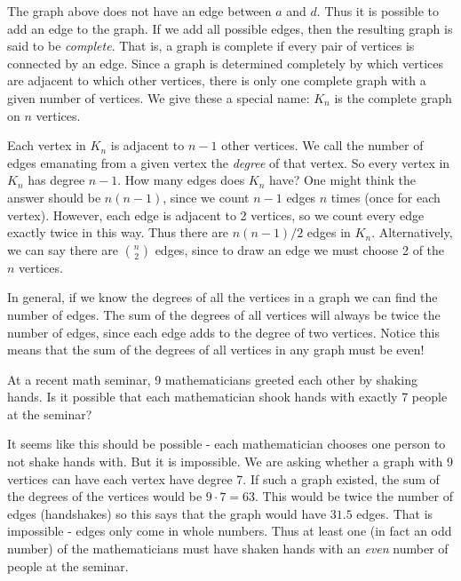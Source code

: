 \documentclass[12pt]{article}
\begin{document}
The graph above does not have an edge between $a$ and $d$.  Thus it is possible to add an edge to the graph.  If we add all possible edges, then the resulting graph is said to be {\em complete}.  That is, a graph is complete if every pair of vertices is connected by an edge.  Since a graph is determined completely by which vertices are adjacent to which other vertices, there is only one complete graph with a given number of vertices.  We give these a special name: $K_n$ is the complete graph on $n$ vertices.

Each vertex in $K_n$ is adjacent to $n-1$ other vertices.  We call the number of edges emanating from a given vertex the {\em degree} of that vertex.  So every vertex in $K_n$ has degree $n-1$.  How many edges does $K_n$ have?  One might think the answer should be $n(n-1)$, since we count $n-1$ edges $n$ times (once for each vertex).  However, each edge is adjacent to 2 vertices, so we count every edge exactly twice in this way.  Thus there are $n(n-1)/2$ edges in $K_n$.  
Alternatively, we can say there are ${n \choose 2}$ edges, since to draw an edge we must choose 2 of the $n$ vertices.

In general, if we know the degrees of all the vertices in a graph we can find the number of edges.  The sum of the degrees of all vertices will always be twice the number of edges, since each edge adds to the degree of two vertices.  Notice this means that the sum of the degrees of all vertices in any graph must be even!

\begin{example}
  At a recent math seminar, 9 mathematicians greeted each other by shaking hands.  Is it possible that each mathematician shook hands with exactly 7 people at the seminar?
  \begin{solution}
    It seems like this should be possible - each mathematician chooses one person to not shake hands with.  But it is impossible.  We are asking whether a graph with 9 vertices can have each vertex have degree 7.  If such a graph existed, the sum of the degrees of the vertices would be $9\cdot 7 = 63$.  This would be twice the number of edges (handshakes) so this says that the graph would have $31.5$ edges.  That is impossible - edges only come in whole numbers.  Thus at least one (in fact an odd number) of the mathematicians must have shaken hands with an {\em even} number of people at the seminar.
  \end{solution}

\end{example}
\end{document}
